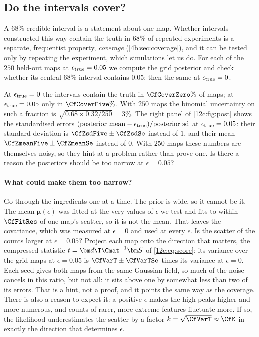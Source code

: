 \subsection{Do the intervals cover?}
\label{12c:sec:coverage}

A $68\%$ credible interval is a statement about one map. Whether intervals constructed this way contain the truth in $68\%$ of
repeated experiments is a separate, frequentist property, \emph{coverage} (\cref{4b:sec:coverage}), and it can be tested only by
repeating the experiment, which simulations let us do. For each of the $250$ held-out maps at $\epsilon_{\rm true}=0.05$ we compute
the grid posterior and check whether its central $68\%$ interval contains $0.05$; then the same at $\epsilon_{\rm true}=0$.

At $\epsilon_{\rm true}=0$ the intervals contain the truth in $\CfCoverZero\%$ of maps; at $\epsilon_{\rm true}=0.05$ only in
$\CfCoverFive\%$. With $250$ maps the binomial uncertainty on such a fraction is $\sqrt{0.68\times0.32/250}=3\%$. The right panel
of \cref{12c:fig:post} shows the standardised errors $(\text{posterior mean}-\epsilon_{\rm true})/\text{posterior sd}$ at
$\epsilon_{\rm true}=0.05$: their standard deviation is $\CfZsdFive\pm\CfZsdSe$ instead of $1$, and their mean $\CfZmeanFive\pm\CfZmeanSe$
instead of $0$. With $250$ maps these numbers are themselves noisy, so they hint at a problem rather than prove one. Is there a
reason the posteriors should be too narrow at $\epsilon=0.05$?

\paragraph{What could make them too narrow?} Go through the ingredients one at a time. The prior is wide, so it cannot be it. The mean
$\bm\mu(\epsilon)$ was fitted at the very values of $\epsilon$ we test and fits to within $\CfFitRes$ of one map's scatter, so it is not
the mean. That leaves the covariance, which was measured at $\epsilon=0$ and used at every $\epsilon$. Is the scatter of the counts
larger at $\epsilon=0.05$? Project each map onto the direction that matters, the compressed statistic $t=\bm d\T\Cmat^{-1}\bm S$ of
\eqref{12c:eq:score}; its variance over the grid maps at $\epsilon=0.05$ is $\CfVarT\pm\CfVarTSe$ times its variance at $\epsilon=0$. Each seed gives
both maps from the same Gaussian field, so much of the noise cancels in this ratio, but not all: it sits above one by somewhat less
than two of its errors. That is a hint, not a proof, and it points the same way as the coverage. There is also a reason to expect it:
a positive $\epsilon$ makes the high peaks higher and more numerous, and counts of rarer, more extreme features fluctuate more. If
so, the likelihood underestimates the scatter by a factor $k=\sqrt{\CfVarT}\approx\CfK$ in exactly the direction that determines $\epsilon$.

